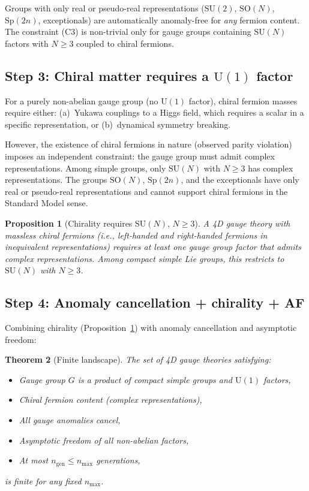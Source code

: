 \documentclass[12pt]{article}
\newtheorem{theorem}{Theorem}[section]
\newtheorem{proposition}[theorem]{Proposition}
\theoremstyle{definition}
\theoremstyle{remark}
\newcommand{\SU}{\mathrm{SU}}
\newcommand{\SO}{\mathrm{SO}}
\newcommand{\Sp}{\mathrm{Sp}}
\newcommand{\UU}{\mathrm{U}}
\begin{document}
Groups with only real or pseudo-real representations
($\SU(2)$, $\SO(N)$, $\Sp(2n)$, exceptionals) are automatically
anomaly-free for \emph{any} fermion content.  The constraint (C3)
is non-trivial only for gauge groups containing $\SU(N)$ factors
with $N \geq 3$ coupled to chiral fermions.

\subsection{Step 3: Chiral matter requires a $\UU(1)$ factor}

For a purely non-abelian gauge group (no $\UU(1)$ factor),
chiral fermion masses require either:
(a)~Yukawa couplings to a Higgs field, which requires a scalar
in a specific representation, or
(b)~dynamical symmetry breaking.

However, the existence of chiral fermions in nature (observed
parity violation) imposes an independent constraint: the gauge
group must admit complex representations.  Among simple groups,
only $\SU(N)$ with $N \geq 3$ has complex representations.
The groups $\SO(N)$, $\Sp(2n)$, and the exceptionals have only
real or pseudo-real representations and cannot support chiral
fermions in the Standard Model sense.

\begin{proposition}[Chirality requires $\SU(N)$, $N \geq 3$]
\label{prop:chirality}
A 4D gauge theory with massless chiral fermions (i.e.,
left-handed and right-handed fermions in inequivalent
representations) requires at least one gauge group factor
that admits complex representations.  Among compact simple
Lie groups, this restricts to $\SU(N)$ with $N \geq 3$.
\end{proposition}

\subsection{Step 4: Anomaly cancellation + chirality + AF}

Combining chirality (Proposition~\ref{prop:chirality}) with
anomaly cancellation and asymptotic freedom:

\begin{theorem}[Finite landscape]
\label{thm:landscape}
The set of 4D gauge theories satisfying:
\begin{itemize}
\item Gauge group $G$ is a product of compact simple groups
  and $\UU(1)$ factors,
\item Chiral fermion content (complex representations),
\item All gauge anomalies cancel,
\item Asymptotic freedom of all non-abelian factors,
\item At most $n_{\mathrm{gen}} \leq n_{\max}$ generations,
\end{itemize}
is finite for any fixed $n_{\max}$.
\end{theorem}
\end{document}
